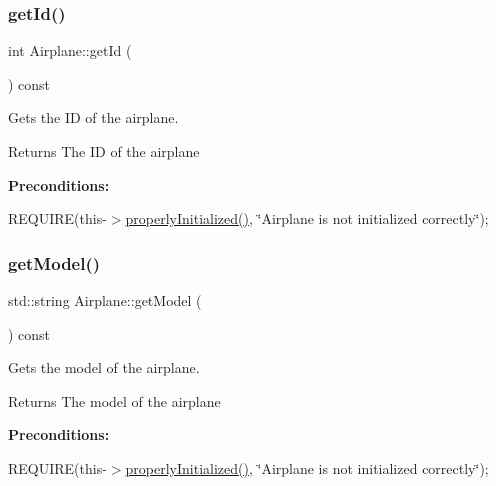 \subsubsection{\texorpdfstring{get\+Id()}{getId()}}
{\footnotesize\ttfamily int Airplane\+::get\+Id (\begin{DoxyParamCaption}{ }\end{DoxyParamCaption}) const}



Gets the ID of the airplane. 

\begin{DoxyReturn}{Returns}
The ID of the airplane
\end{DoxyReturn}
{\bfseries Preconditions\+:}
\begin{DoxyItemize}
\item R\+E\+Q\+U\+I\+RE(this-\/$>$\mbox{\hyperlink{class_airplane_a6f80df8f692cc8d67d292c1e9f26d59e}{properly\+Initialized()}}, \char`\"{}\+Airplane is not initialized correctly\char`\"{}); 
\end{DoxyItemize}\mbox{\label{class_airplane_a1431ee85bdcb3238cf6f0aefc51d8828}} 
\subsubsection{\texorpdfstring{get\+Model()}{getModel()}}
{\footnotesize\ttfamily std\+::string Airplane\+::get\+Model (\begin{DoxyParamCaption}{ }\end{DoxyParamCaption}) const}



Gets the model of the airplane. 

\begin{DoxyReturn}{Returns}
The model of the airplane
\end{DoxyReturn}
{\bfseries Preconditions\+:}
\begin{DoxyItemize}
\item R\+E\+Q\+U\+I\+RE(this-\/$>$\mbox{\hyperlink{class_airplane_a6f80df8f692cc8d67d292c1e9f26d59e}{properly\+Initialized()}}, \char`\"{}\+Airplane is not initialized correctly\char`\"{}); 
\end{DoxyItemize}\mbox{\label{class_airplane_a29068c4308e9aef5f8d944840b4dba10}} 
